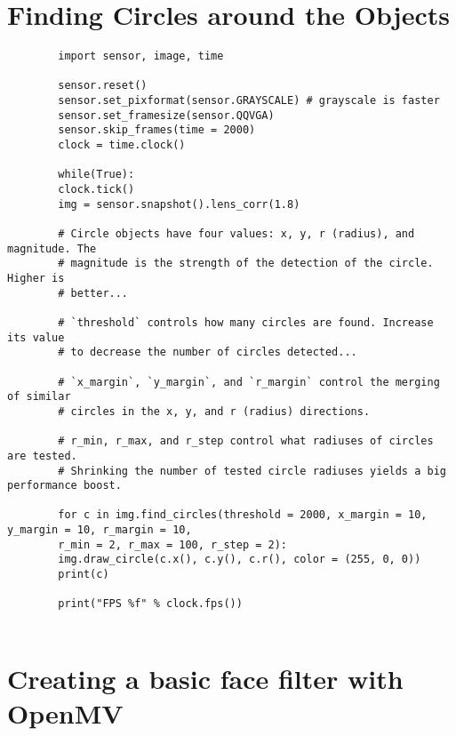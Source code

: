 	\section{Finding Circles around the Objects}

	\begin{verbatim}
		import sensor, image, time
		
		sensor.reset()
		sensor.set_pixformat(sensor.GRAYSCALE) # grayscale is faster
		sensor.set_framesize(sensor.QQVGA)
		sensor.skip_frames(time = 2000)
		clock = time.clock()
		
		while(True):
		clock.tick()
		img = sensor.snapshot().lens_corr(1.8)
		
		# Circle objects have four values: x, y, r (radius), and magnitude. The
		# magnitude is the strength of the detection of the circle. Higher is
		# better...
		
		# `threshold` controls how many circles are found. Increase its value
		# to decrease the number of circles detected...
		
		# `x_margin`, `y_margin`, and `r_margin` control the merging of similar
		# circles in the x, y, and r (radius) directions.
		
		# r_min, r_max, and r_step control what radiuses of circles are tested.
		# Shrinking the number of tested circle radiuses yields a big performance boost.
		
		for c in img.find_circles(threshold = 2000, x_margin = 10, y_margin = 10, r_margin = 10,
		r_min = 2, r_max = 100, r_step = 2):
		img.draw_circle(c.x(), c.y(), c.r(), color = (255, 0, 0))
		print(c)
		
		print("FPS %f" % clock.fps())
		
	\end{verbatim}

	\section{Creating a basic face filter with OpenMV}


